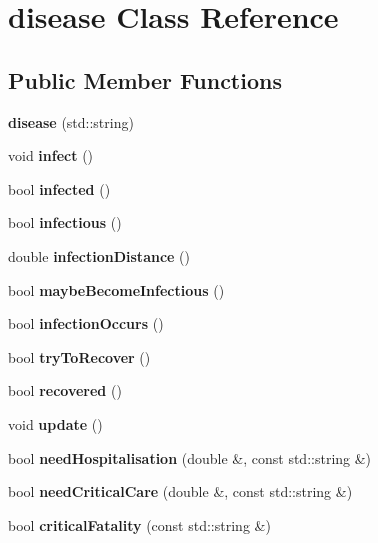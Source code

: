 \hypertarget{classdisease}{}\section{disease Class Reference}
\label{classdisease}
\subsection*{Public Member Functions}
\begin{DoxyCompactItemize}
\item 
\mbox{\label{classdisease_afb32990aebbbda5e4c768c33863de1ec}} 
{\bfseries disease} (std\+::string)
\item 
\mbox{\label{classdisease_a2e43aa4e1b237b34a088142e5ba05645}} 
void {\bfseries infect} ()
\item 
\mbox{\label{classdisease_afea5ed484afbc1c34188041e29b5223f}} 
bool {\bfseries infected} ()
\item 
\mbox{\label{classdisease_ac806183c372b67568f1cce1f564a7cec}} 
bool {\bfseries infectious} ()
\item 
\mbox{\label{classdisease_afa1406922bad5c37522a78f4a246d8cf}} 
double {\bfseries infection\+Distance} ()
\item 
\mbox{\label{classdisease_a75a1c90ff2112da686cd2e20705238c7}} 
bool {\bfseries maybe\+Become\+Infectious} ()
\item 
\mbox{\label{classdisease_ae99ba952f5e81ce98e2d2b849c05ce04}} 
bool {\bfseries infection\+Occurs} ()
\item 
\mbox{\label{classdisease_add6e8db6abec70b4bd1eae3e6f2a3cd2}} 
bool {\bfseries try\+To\+Recover} ()
\item 
\mbox{\label{classdisease_a50f9409e8a2df6eab075b0610ad68114}} 
bool {\bfseries recovered} ()
\item 
\mbox{\label{classdisease_aabaa74deee9e5b68062f9b09674c1dc5}} 
void {\bfseries update} ()
\item 
\mbox{\label{classdisease_aac3946d6d35b4d61163add744e3f1bb9}} 
bool {\bfseries need\+Hospitalisation} (double \&, const std\+::string \&)
\item 
\mbox{\label{classdisease_a4347cb7840d80258b67caa3f169b25e8}} 
bool {\bfseries need\+Critical\+Care} (double \&, const std\+::string \&)
\item 
\mbox{\label{classdisease_a4bb1ba1a5fc9af6a941bf690d2ab2908}} 
bool {\bfseries critical\+Fatality} (const std\+::string \&)
\end{DoxyCompactItemize}
